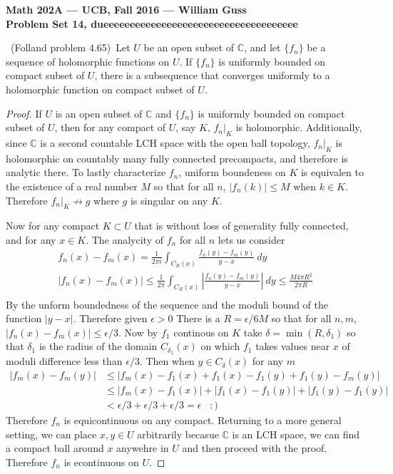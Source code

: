 \documentclass[11pt]{amsart}
\theoremstyle{definition}
\numberwithin{theorem}{section}
\numberwithin{definition}{section}
\numberwithin{equation}{section}
\begin{document}
\begin{center}{\bf Math 202A --- UCB, Fall 2016 --- William Guss}
\\
{\bf Problem Set 14, dueeeeeeeeeeeeeeeeeeeeeeeeeeeeeeeeeeeee}
\end{center}

\medskip {}\ (Folland problem 4.65)\ Let $U$ be an open subset of $\mathbb{C}$, and let $\{f_n\}$ be a sequence of holomorphic functions on $U$. If $\{f_n\}$ is uniformly bounded on compact subset of $U$, there is a subsequence  that converges uniformly to a holomorphic function on compact subset of $U$.
\begin{proof}
	If $U$ is an open subset of $\mathbb{C}$ and $\{f_n\}$ is uniformly bounded on compact subset of $U$, then for any compact of $U$, say $K$, $f_n|_K$ is holomorphic. Additionally, since $\mathbb{C}$ is a second countable LCH space with the open ball topology, $f_n|_K$ is holomorphic on countably many fully connected precompacts, and therefore is analytic there. To lastly characterize $f_n$, uniform boundeness on $K$ is equivalen to the existence of a real number $M$ so that for all $n$, $|f_n(k)| \leq M$ when $k \in K$. Therefore $f_n|_K \not\to g$ where $g$ is singular on any $K$.

 	Now for any compact $K \subset U$ that is without loss of generality fully connected, and for any $x \in K$. The analycity of $f_n$ for all $n$ lets us consider
 	\begin{equation*}
 		\begin{aligned}
 			f_n(x) - f_m(x) = \frac{1}{2\pi i} \int_{C_R(x)} \frac{f_n(y) - f_m(y)}{y - x}\ dy \\
 			|f_n(x) - f_m(x)| \leq \frac{1}{2\pi} \int_{C_R(x)} \left|\frac{f_n(y) - f_m(y)}{y - x}\right|\ dy \leq \frac{M 4\pi R^2}{2 \pi R}\\
 		\end{aligned}
 	\end{equation*}
 	By the unform boundedness of the sequence and the moduli bound of the function $|y-x|$. Therefore given $\epsilon >0$
 	There is a $R = \epsilon/{6M}$ so that for all $n,m$, $|f_n(x) - f_m(x)| \leq \epsilon/3.$ Now by $f_1$ continous on $K$ take $\delta = \min(R, \delta_1)$ so that $\delta_1$ is the radius of the domain $C_{\delta_1}(x)$ on which $f_1$ takes values near $x$ of moduli difference less than $\epsilon/3.$ Then when $y \in C_{\delta}(x)$ for any $m$
 	\begin{equation*}
 	\begin{aligned}
 		|f_m(x) - f_m(y)| &\leq |f_m(x) - f_1(x) + f_1(x) - f_1(y) + f_1(y) - f_m(y)| \\
 	&\leq |f_m(x) - f_1(x)| + |f_1(x) - f_1(y)| + |f_1(y) - f_1(y)|
 	\\
 	&< \epsilon/3 + \epsilon/3 + \epsilon/3 = \epsilon\;\;\; :)
 	\end{aligned}
 	\end{equation*}
 	Therefore $f_n$ is equicontinuous on any compact. Returning to a more general setting, we can place $x,y \in U$ arbitrarily becasue $\mathbb{C}$ is an LCH space, we can find a compact ball around $x$ anywehre in $U$ and then proceed with the proof. Therefore $f_n$ is econtinuous on $U.$


\end{proof}
\end{document}
